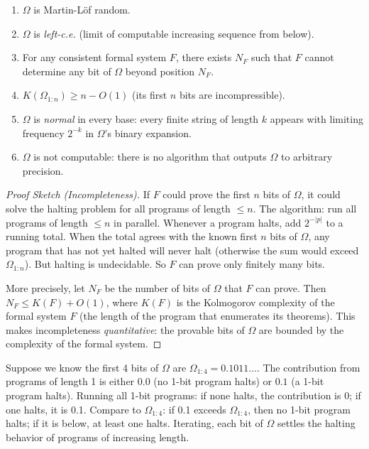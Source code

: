 \begin{theorem}
\label{thm:omega_properties}
\begin{enumerate}
\item $\Omega$ is Martin-L\"of random.
\item $\Omega$ is \emph{left-c.e.} (limit of computable increasing sequence from below).
\item For any consistent formal system $F$, there exists $N_F$ such that $F$ cannot determine any bit of $\Omega$ beyond position $N_F$.
\item $K(\Omega_{1:n}) \ge n - O(1)$ (its first $n$ bits are incompressible).
\item $\Omega$ is \emph{normal} in every base: every finite string of length $k$ appears with limiting frequency $2^{-k}$ in $\Omega$'s binary expansion.
\item $\Omega$ is not computable: there is no algorithm that outputs $\Omega$ to arbitrary precision.
\end{enumerate}
\end{theorem}

\begin{proof}[Proof Sketch (Incompleteness)]
If $F$ could prove the first $n$ bits of $\Omega$, it could solve the halting problem for all programs of length $\le n$. The algorithm: run all programs of length $\le n$ in parallel. Whenever a program halts, add $2^{-|p|}$ to a running total. When the total agrees with the known first $n$ bits of $\Omega$, any program that has not yet halted will never halt (otherwise the sum would exceed $\Omega_{1:n}$). But halting is undecidable. So $F$ can prove only finitely many bits.

More precisely, let $N_F$ be the number of bits of $\Omega$ that $F$ can prove. Then $N_F \le K(F) + O(1)$, where $K(F)$ is the Kolmogorov complexity of the formal system $F$ (the length of the program that enumerates its theorems). This makes incompleteness \emph{quantitative}: the provable bits of $\Omega$ are bounded by the complexity of the formal system.
\end{proof}

\begin{example}
Suppose we know the first 4 bits of $\Omega$ are $\Omega_{1:4} = 0.1011\ldots$. The contribution from programs of length 1 is either $0.0$ (no 1-bit program halts) or $0.1$ (a 1-bit program halts). Running all 1-bit programs: if none halts, the contribution is 0; if one halts, it is 0.1. Compare to $\Omega_{1:4}$: if 0.1 exceeds $\Omega_{1:4}$, then no 1-bit program halts; if it is below, at least one halts. Iterating, each bit of $\Omega$ settles the halting behavior of programs of increasing length.
\end{example}

